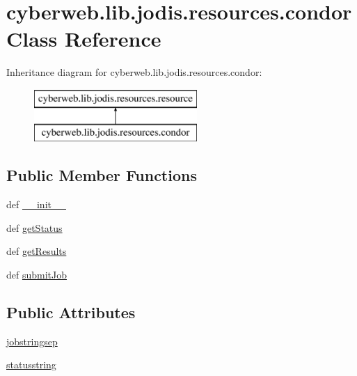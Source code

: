 \hypertarget{classcyberweb_1_1lib_1_1jodis_1_1resources_1_1condor}{\section{cyberweb.\-lib.\-jodis.\-resources.\-condor \-Class \-Reference}
\label{classcyberweb_1_1lib_1_1jodis_1_1resources_1_1condor}
}
\-Inheritance diagram for cyberweb.\-lib.\-jodis.\-resources.\-condor\-:\begin{figure}[H]
\begin{center}
\leavevmode
\includegraphics[height=2.000000cm]{classcyberweb_1_1lib_1_1jodis_1_1resources_1_1condor}
\end{center}
\end{figure}
\subsection*{\-Public \-Member \-Functions}
\begin{DoxyCompactItemize}
\item 
def \hyperlink{classcyberweb_1_1lib_1_1jodis_1_1resources_1_1condor_a2ff36cfad860c59468b389d843967c12}{\-\_\-\-\_\-init\-\_\-\-\_\-}
\item 
def \hyperlink{classcyberweb_1_1lib_1_1jodis_1_1resources_1_1condor_ab84dbc2e24c12b9d272834624b2f8304}{get\-Status}
\item 
def \hyperlink{classcyberweb_1_1lib_1_1jodis_1_1resources_1_1condor_a024636367dd0b14b5c4d077cea14dcd0}{get\-Results}
\item 
def \hyperlink{classcyberweb_1_1lib_1_1jodis_1_1resources_1_1condor_af07589edf1d016905b0fd92a034aff10}{submit\-Job}
\end{DoxyCompactItemize}
\subsection*{\-Public \-Attributes}
\begin{DoxyCompactItemize}
\item 
\hyperlink{classcyberweb_1_1lib_1_1jodis_1_1resources_1_1condor_aee173b2e036132c0dd7e8f2c666d9db9}{jobstringsep}
\item 
\hyperlink{classcyberweb_1_1lib_1_1jodis_1_1resources_1_1condor_ab6a8d8f44065c5ee961d4d6e19c8ad67}{statusstring}
\end{DoxyCompactItemize}


